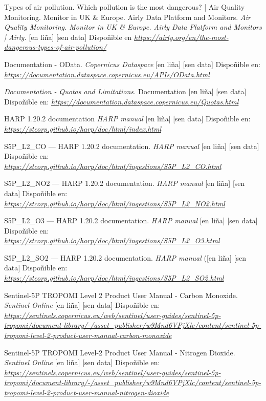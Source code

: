 \begin{thebibliography}{99}
     Types of air pollution. Which pollution is the most dangerous? | Air Quality Monitoring. Monitor in UK \& Europe. Airly Data Platform and Monitors. \textit{Air Quality
    Monitoring. Monitor in UK \& Europe. Airly Data Platform and Monitors | Airly.} [en liña] [sen data] Dispoñible en \textit{\url{https://airly.org/en/the-most-dangerous-types-of-air-pollution/}}

     Documentation - OData. \textit{Copernicus Dataspace} [en liña] [sen data] Dispoñible en: \textit{\url{https://documentation.dataspace.copernicus.eu/APIs/OData.html}}

     \textit{Documentation - Quotas and Limitations.} Documentation [en liña] [sen data] Dispoñible en:  \textit{\url{https://documentation.dataspace.copernicus.eu/Quotas.html}}

     HARP 1.20.2 documentation \textit{HARP manual} [en liña] [sen data] Dispoñible en: \textit{\url{https://stcorp.github.io/harp/doc/html/index.html}}

     S5P\_L2\_CO — HARP 1.20.2 documentation. \textit{HARP manual} [en liña] [sen data] Dispoñible en: \textit{\url{https://stcorp.github.io/harp/doc/html/ingestions/S5P_L2_CO.html}}

     S5P\_L2\_NO2 — HARP 1.20.2 documentation. \textit{HARP manual} [en liña] [sen data] Dispoñible en: \textit{\url{https://stcorp.github.io/harp/doc/html/ingestions/S5P_L2_NO2.html}}

     S5P\_L2\_O3 — HARP 1.20.2 documentation. \textit{HARP manual} [en liña] [sen data] Dispoñible en: \textit{\url{https://stcorp.github.io/harp/doc/html/ingestions/S5P_L2_O3.html}}

     S5P\_L2\_SO2 — HARP 1.20.2 documentation. \textit{HARP manual} ([en liña] [sen data] Dispoñible en: \textit{\url{https://stcorp.github.io/harp/doc/html/ingestions/S5P_L2_SO2.html}}

     Sentinel-5P TROPOMI Level 2 Product User Manual - Carbon Monoxide. \textit{Sentinel Online} [en liña] [sen data] Dispoñible en: \textit{\url{https://sentinels.copernicus.eu/web/sentinel/user-guides/sentinel-5p-tropomi/document-library/-/asset_publisher/w9Mnd6VPjXlc/content/sentinel-5p-tropomi-level-2-product-user-manual-carbon-monoxide}}

     Sentinel-5P TROPOMI Level-2 Product User Manual - Nitrogen Dioxide. \textit{Sentinel Online} [en liña] [sen data] Dispoñible en: \textit{\url{https://sentinels.copernicus.eu/web/sentinel/user-guides/sentinel-5p-tropomi/document-library/-/asset_publisher/w9Mnd6VPjXlc/content/sentinel-5p-tropomi-level-2-product-user-manual-nitrogen-dioxide}}


\end{thebibliography}

